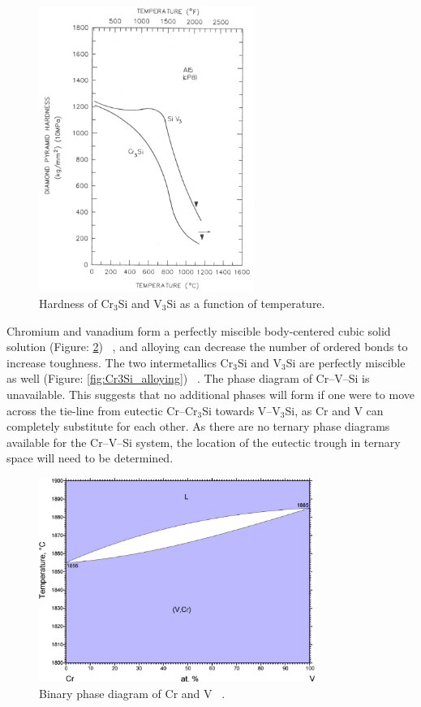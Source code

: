 %
\begin{figure}[H]
\begin{center}
\includegraphics[width=7cm]{VCr3Si_hardness}
\vspace{-2mm}
\caption{Hardness of Cr$_3$Si and V$_3$Si as a function of temperature.}\label{fig:VCr_hardness}
\end{center}
\end{figure}
\vspace{-1cm}
%
Chromium and vanadium form a perfectly miscible body-centered cubic solid solution (Figure: \ref{fig:CrV}) ~\cite{kocherzhinskii85}, and alloying can decrease the number of ordered bonds to increase toughness. The two intermetallics Cr$_3$Si and V$_3$Si are perfectly miscible as well (Figure: \ref{fig:Cr3Si_alloying}) ~\cite{shah92}. The phase diagram of Cr--V--Si is unavailable. This suggests that no additional phases will form if one were to move across the tie-line from eutectic Cr--Cr$_3$Si towards V--V$_3$Si, as Cr and V can completely substitute for each other. As there are no ternary phase diagrams available for the Cr--V--Si system, the location of the eutectic trough in ternary space will need to be determined.
%
\vspace{1mm}
\begin{figure}[H]
\begin{center}
\includegraphics[width=9cm]{CrV}
\caption{Binary phase diagram of Cr and V ~\cite{kocherzhinskii85}.}\label{fig:CrV}
\end{center}
\end{figure}

